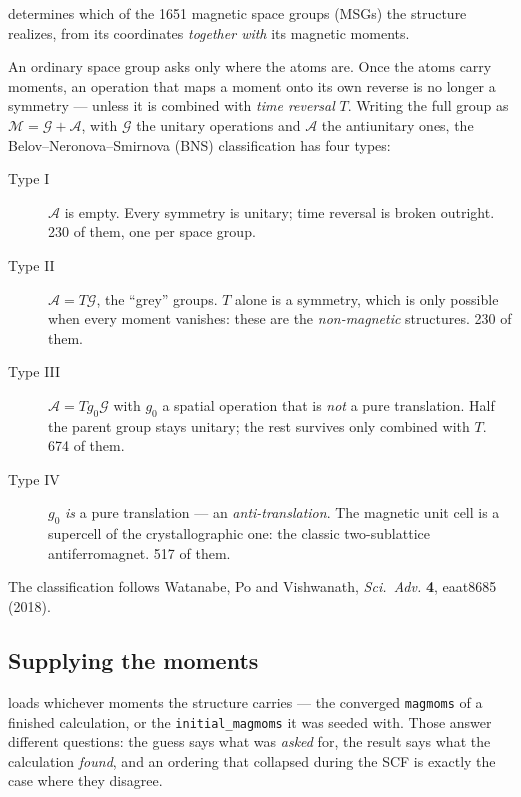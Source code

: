 \menusep{} determines which of the
1651 magnetic space groups (MSGs) the structure realizes, from its coordinates
\emph{together with} its magnetic moments.

An ordinary space group asks only where the atoms are. Once the atoms carry
moments, an operation that maps a moment onto its own reverse is no longer a
symmetry --- unless it is combined with \emph{time reversal} $T$. Writing the
full group as $\mathcal{M} = \mathcal{G} + \mathcal{A}$, with $\mathcal{G}$ the
unitary operations and $\mathcal{A}$ the antiunitary ones, the
Belov--Neronova--Smirnova (BNS) classification has four types:

\begin{description}
  \item[Type I] $\mathcal{A}$ is empty. Every symmetry is unitary; time
    reversal is broken outright. 230 of them, one per space group.
  \item[Type II] $\mathcal{A} = T\mathcal{G}$, the ``grey'' groups. $T$ alone
    is a symmetry, which is only possible when every moment vanishes: these
    are the \emph{non-magnetic} structures. 230 of them.
  \item[Type III] $\mathcal{A} = T g_0 \mathcal{G}$ with $g_0$ a spatial
    operation that is \emph{not} a pure translation. Half the parent group
    stays unitary; the rest survives only combined with $T$. 674 of them.
  \item[Type IV] $g_0$ \emph{is} a pure translation --- an
    \emph{anti-translation}. The magnetic unit cell is a supercell of the
    crystallographic one: the classic two-sublattice antiferromagnet.
    517 of them.
\end{description}

The classification follows Watanabe, Po and Vishwanath, \emph{Sci.\ Adv.}
\textbf{4}, eaat8685 (2018).

\subsection{Supplying the moments}

 loads whichever moments the structure carries ---
the converged \texttt{magmoms} of a finished calculation, or the
\texttt{initial\_magmoms} it was seeded with. Those answer different
questions: the guess says what was \emph{asked} for, the result says what the
calculation \emph{found}, and an ordering that collapsed during the SCF is
exactly the case where they disagree.

